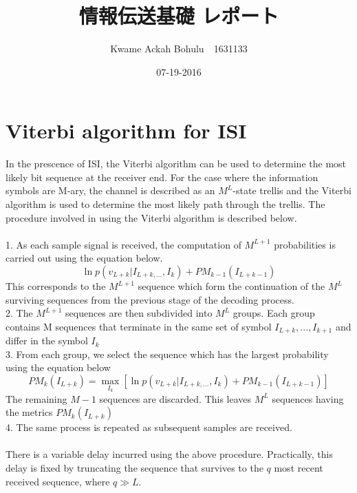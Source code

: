 \documentclass[24 pts]{article}
\title{情報伝送基礎 レポート}
\date{07-19-2016}
\author{Kwame Ackah Bohulu　1631133}
\begin{document}
\maketitle
\section{Viterbi algorithm for ISI}
In the prescence of ISI, the Viterbi algorithm can be used to determine the most likely bit sequence at the receiver end. For the case where the information symbols are M-ary, the channel is described as an $M^L$-state trellis and the Viterbi algorithm is used to determine the most likely path through the trellis. The procedure involved in using the Viterbi algorithm is described below.
\paragraph{}
1. As each sample signal is received, the computation of $M^{L+1}$ probabilities is carried out using the equation below.
\begin{equation}
\ln p(v_{L+k}|I_{L+k,...},I_{k})+PM_{k-1}(I_{L+k-1})
\end{equation}
This corresponds to the $M^{L+1}$ sequence which form the continuation of the $M^{L}$ surviving sequences from the previous stage of the decoding process.\\
2. The $M^{L+1}$ sequences are then subdivided into $M^{L}$ groups. Each group contains M sequences that terminate in the same set of symbol $I_{L+k},...,I_{k+1}$ and differ in the symbol $I_k$\\
3. From each group, we select the sequence which has the largest probability using the equation below
\begin{equation}
PM_k(I_{L+k})=\max_{I_{k}}[\ln p(v_{L+k}|I_{L+k,...},I_{k})+PM_{k-1}(I_{L+k-1})]
\end{equation}
The remaining $M-1$ sequences are discarded. This leaves $M^L$ sequences having the metrics $PM_k(I_{L+k})$\\
4. The same process is repeated as subsequent samples are received.
\paragraph{}
There is a variable delay incurred using the above procedure. Practically, this delay is fixed by truncating the sequence that survives to the $q$ most recent received sequence, where $q \gg L$.
\end{document}
